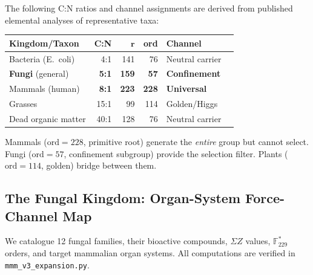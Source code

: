 \begin{result}
\label{res:cn_kingdom}
The following C:N ratios and channel assignments are derived from published
elemental analyses of representative taxa:

\begin{center}
\begin{tabular}{@{}lrrrll@{}}
\toprule
\textbf{Kingdom/Taxon} & \textbf{C:N} & $\boldsymbol{r}$ & \textbf{ord} & \textbf{Channel} \\
\midrule
Bacteria (E.\ coli) & 4:1 & 141 & 76 & Neutral carrier \\
\textbf{Fungi} (general) & \textbf{5:1} & \textbf{159} & \textbf{57} & \textbf{Confinement} \\
Mammals (human) & \textbf{8:1} & \textbf{223} & \textbf{228} & \textbf{Universal} \\
Grasses & 15:1 & 99 & 114 & Golden/Higgs \\
Dead organic matter & 40:1 & 128 & 76 & Neutral carrier \\
\bottomrule
\end{tabular}
\end{center}

Mammals ($\mathrm{ord} = 228$, primitive root) generate the \emph{entire}
group but cannot select. Fungi ($\mathrm{ord} = 57$, confinement subgroup)
provide the selection filter. Plants ($\mathrm{ord} = 114$, golden) bridge
between them.
\end{result}

\subsection{The Fungal Kingdom: Organ-System Force-Channel Map}

We catalogue 12 fungal families, their bioactive compounds, $\Sigma Z$
values, $\mathbb{F}_{229}^*$ orders, and target mammalian organ systems.
All computations are verified in \texttt{mmm\_v3\_expansion.py}.

